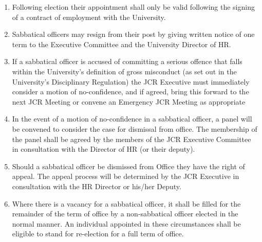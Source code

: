\begin{enumerate}
\begin{enumerate}
        \item Following election their appointment shall only be valid following the signing of a
contract of employment with the University.
        \item Sabbatical officers may resign from their post by giving written notice of one term to the Executive Committee and the University Director of HR.
        \item If a sabbatical officer is accused of committing a serious offence that falls within the University’s definition of gross misconduct (as set out in the University’s Disciplinary Regulation) the JCR Executive must immediately consider a motion of no-confidence, and if agreed, bring this forward to the next JCR Meeting or convene an Emergency JCR Meeting as appropriate
        \item In the event of a motion of no-confidence in a sabbatical officer, a panel will be convened to consider the case for dismissal from office. The membership of the panel shall be agreed by the members of the JCR Executive Committee in consultation with the Director of HR (or their deputy).
        \item Should a sabbatical officer be dismissed from Office they have the right of appeal. The appeal process will be determined by the JCR Executive in consultation with the HR Director or his/her Deputy.
        \item Where there is a vacancy for a sabbatical officer, it shall be filled for the remainder of the term of office by a non-sabbatical officer elected in the normal manner. An individual appointed in these circumstances shall be eligible to stand for re-election for a full term of office.
    \end{enumerate}
\end{enumerate}

